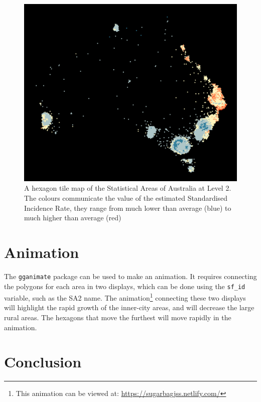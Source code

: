 \documentclass{monashthesis}
\begin{document}
\begin{figure}[H]
\centering
\includegraphics[width=16cm]{figures/03-algorithm/aus_melanoma_p_hex.pdf}
\caption{\label{fig:melanoma-hex}A hexagon tile map of the Statistical Areas of Australia at Level 2. The colours communicate the value of the estimated Standardised Incidence Rate, they range from much lower than average (blue) to much higher than average (red)}
\end{figure}

\hypertarget{animation}{%
\section{Animation}\label{animation}}

The \texttt{gganimate} \autocite{gganimate} package can be used to make an animation.
It requires connecting the polygons for each area in two displays, which can be done using the \texttt{sf\_id} variable, such as the SA2 name.
The animation\footnote{This animation can be viewed at: \url{https://sugarbagjss.netlify.com/}} connecting these two displays will highlight the rapid growth of the inner-city areas, and will decrease the large rural areas. The hexagons that move the furthest will move rapidly in the animation.

\hypertarget{conclusion}{%
\section{Conclusion}\label{conclusion}}
\end{document}
